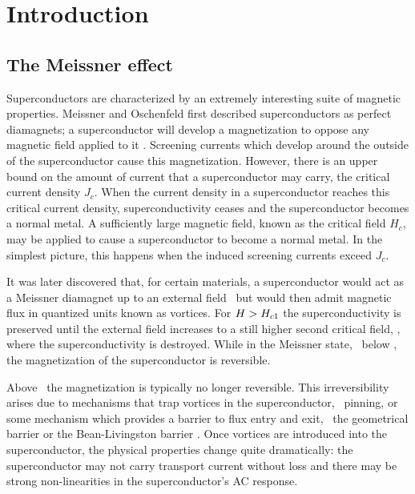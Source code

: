 % 

\chapter{Introduction}

\section{The Meissner effect}

Superconductors are characterized by an extremely interesting
suite of magnetic properties. 
Meissner and Oschenfeld first described superconductors
as perfect diamagnets; 
a superconductor will develop
a magnetization to oppose any magnetic field applied to 
it \cite{meissner_dn_21_787_1933}. 
Screening currents which develop around the outside of the superconductor
cause this magnetization.
However, there is an upper bound on the amount of
current that a superconductor may carry, the critical current 
density $J_c$. When the current density in a superconductor reaches this 
critical current density, superconductivity ceases and the 
superconductor becomes a normal metal. A sufficiently large 
magnetic field, known as the critical field $H_c$,  
may be applied to cause a superconductor to become a normal metal.
In the simplest picture, this happens when the induced screening
currents exceed $J_c$. 


\index{\hcone}
\index{\hctwo}
It was later discovered that, for certain materials, a superconductor
would act as a Meissner diamagnet up to an external 
field \hcone\ but would then admit magnetic flux in quantized
units known as vortices. For $H> H_{c1}$ the superconductivity
is preserved until the external field increases to a still
higher second critical field, \hctwo, where the superconductivity is
destroyed. 
While in the Meissner state,
\ie\ below \hcone, the magnetization of the superconductor is
reversible. 

Above \hcone\ the magnetization is typically no longer 
reversible. This irreversibility arises due to
mechanisms that trap vortices in the superconductor, \ie\ pinning,
or some mechanism which provides a barrier to flux entry and exit, \ie\
the geometrical barrier \cite{zeldov_prl_73_1428_1994} or the 
Bean-Livingston barrier \cite{bean_prl_12_14_1973}.
Once vortices are introduced into the superconductor, the physical
properties change quite dramatically: the superconductor may not carry 
transport current without loss and there may be strong non-linearities
in the superconductor's AC response. 

